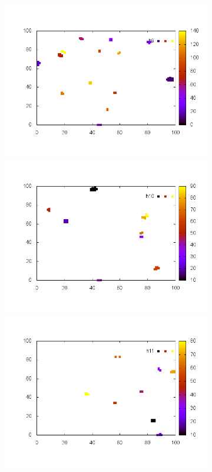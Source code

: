\documentclass[10pt,a4paper]{article}
\begin{document}
\begin{figure}
\begin{subfigure}[b]{1\textwidth}
\end{subfigure}
\begin{subfigure}[b]{1\textwidth}
\includegraphics[scale=.3]{./img/SCC_Stable3/cut99p/9.png}
\includegraphics[scale=.3]{./img/SCC_Stable3/cut99p/10.png}
\includegraphics[scale=.3]{./img/SCC_Stable3/cut99p/11.png}

\end{subfigure}
\end{figure}
\end{document}
